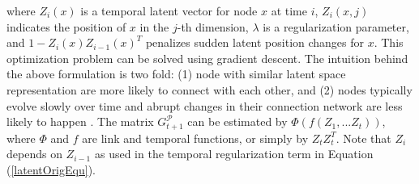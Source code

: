 where $Z_i(x)$ is a temporal latent vector for node $x$ at time $i$, $Z_i(x,j)$ indicates the position of $x$ in the $j$-th dimension, $\lambda$ is a regularization parameter, and $1-Z_{i}(x)Z_{i-1}(x)^T$ penalizes sudden latent position changes for $x$. This optimization problem can be solved using gradient descent. The intuition behind the above formulation is two fold: (1) node with similar latent space representation are more likely to connect with each other, and (2) nodes typically evolve slowly over time and abrupt changes in their connection network are less likely to happen \cite{zhang2014inferring}. 
The matrix $G^\mathcal{P}_{t+1}$ can be estimated by $\Phi(f(Z_1,...Z_t))$, where $\Phi$ and $f$ are link and temporal functions, or simply by $Z_tZ_t^T$. Note that $Z_i$ depends on $Z_{i-1}$ as used in the temporal regularization term in Equation (\ref{latentOrigEqu}).

 



